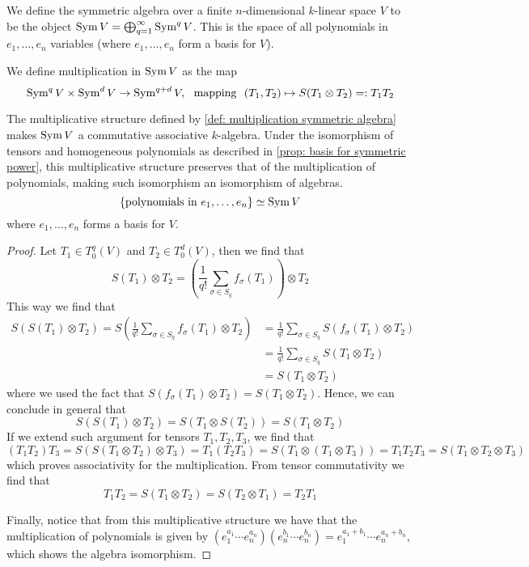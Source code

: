 \begin{definition}
  We define the symmetric algebra over a finite \(n\)-dimensional \(k\)-linear
  space \(V\) to be the object \(\operatorname{Sym} V = \bigoplus_{q=1}^\infty \operatorname{Sym}^q V\).
  This is the space of all polynomials in \(e_1, \dots, e_n\) variables (where
  \(e_1, \dots, e_n\) form a basis for \(V\)).

  We define multiplication in \(\operatorname{Sym} V\) as the map
  \begin{equation}\label{def: multiplication symmetric algebra}
    \operatorname{Sym}^q V \times \operatorname{Sym}^d V \to \operatorname{Sym}^{q + d} V,\ \text{ mapping }\
    (T_1, T_2) \mapsto S(T_1 \otimes T_2) =: T_1 T_2
  \end{equation}
\end{definition}

\begin{proposition}
  The multiplicative structure defined by \cref{def: multiplication symmetric
  algebra} makes \(\operatorname{Sym} V\) a commutative associative \(k\)-algebra. Under the
  isomorphism of tensors and homogeneous polynomials as described in
  \cref{prop: basis for symmetric power}, this multiplicative structure
  preserves that of the multiplication of polynomials, making such isomorphism
  an isomorphism of algebras.
  \[
    \{\text{polynomials in } e_1, \dots, e_n\} \simeq \operatorname{Sym} V
  \]
  where \(e_1, \dots, e_n\) forms a basis for \(V\).
\end{proposition}

\begin{proof}
  Let \(T_1 \in T_0^q(V)\) and \(T_2 \in T_0^d(V)\), then we find that
  \[
    S(T_1) \otimes T_2 = \left( \frac{1}{q!} \sum_{\sigma \in S_q}
    f_\sigma(T_1) \right) \otimes T_2
  \]
  This way we find that
  \begin{align*}
    S(S(T_1) \otimes T_2) = S \left( \frac{1}{q!} \sum_{\sigma \in S_q}
    f_\sigma(T_1) \otimes T_2 \right)
    &= \frac{1}{q!} \sum_{\sigma \in S_q} S(f_\sigma(T_1) \otimes T_2)
    \\
    &= \frac{1}{q!} \sum_{\sigma \in S_q} S(T_1 \otimes T_2) \\
    &= S(T_1 \otimes T_2)
  \end{align*}
  where we used the fact that \(S(f_\sigma(T_1) \otimes T_2) = S(T_1 \otimes
  T_2)\). Hence, we can conclude in general that
  \[
    S(S(T_1) \otimes T_2) = S(T_1 \otimes S(T_2)) = S(T_1 \otimes T_2)
  \]
  If we extend such argument for tensors \(T_1, T_2, T_3\), we find that
  \[
    (T_1 T_2) T_3 = S(S(T_1 \otimes T_2) \otimes T_3)
    = T_1 (T_2 T_3) = S(T_1 \otimes (T_1 \otimes T_3))
    = T_1 T_2 T_3 = S(T_1 \otimes T_2 \otimes T_3)
  \]
  which proves associativity for the multiplication. From tensor commutativity
  we find that
  \[
    T_1 T_2 = S(T_1 \otimes T_2) = S(T_2 \otimes T_1) = T_2 T_1
  \]

  Finally, notice that from this multiplicative structure we have that the
  multiplication of polynomials is given by
  \((e_1^{a_1} \cdots e_n^{a_n}) (e_n^{b_1} \cdots e_n^{b_n}) = e_1^{a_1 + b_1} \cdots e_n^{a_n
  + b_n}\), which shows the algebra isomorphism.
\end{proof}

